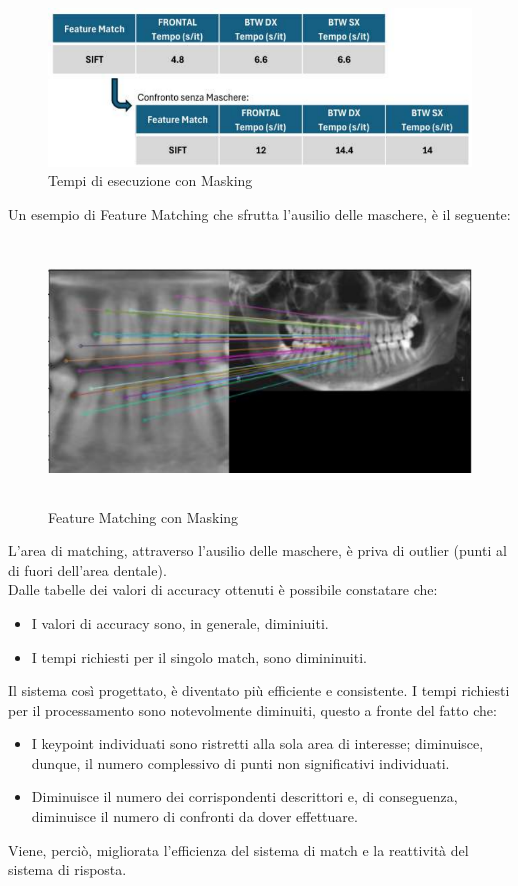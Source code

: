 \documentclass[12pt,a4paper,openright,twoside]{book}
\begin{document}
\begin{figure}[H]
	\centering
	\includegraphics{figures/tempi2_1.pdf}
   	\caption{Tempi di esecuzione con Masking}
	\label{fig:tempi2}
\end{figure}
Un esempio di Feature Matching che sfrutta l'ausilio delle maschere, è il seguente:
\begin{figure}[H]
	\centering
	\includegraphics[width=15cm,height=7cm]{figures/matchmask.pdf}
    	\caption{Feature Matching con Masking}
	\label{fig:matchmask}
\end{figure}

L'area di matching, attraverso l'ausilio delle maschere, è priva di outlier (punti al di fuori dell'area dentale).\\

Dalle tabelle dei valori di accuracy ottenuti è possibile constatare che:
\begin{itemize}
\item I valori di accuracy sono, in generale, diminiuiti.
\item I tempi richiesti per il singolo match, sono dimininuiti.
\end{itemize}

Il sistema così progettato, è diventato più efficiente e consistente. I tempi richiesti per il processamento sono notevolmente diminuiti, questo a fronte del fatto che:
\begin{itemize}
\item I keypoint individuati sono ristretti alla sola area di interesse; diminuisce, dunque, il numero complessivo di punti non significativi individuati.
\item Diminuisce il numero dei corrispondenti descrittori e, di conseguenza, diminuisce il numero di confronti da dover effettuare.
\end{itemize}
Viene, perciò, migliorata l'efficienza del sistema di match e la reattività del sistema di risposta.\\
\end{document}
